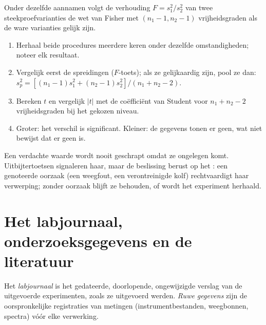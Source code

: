 \begin{proposition}[$F$-toets]\label{prop:b3:lab-techniques-3:f-test}
Onder dezelfde aannamen volgt de verhouding $F = s_1^2/s_2^2$ van twee steekproefvarianties
de wet van Fisher met $(n_1 - 1, n_2 - 1)$ vrijheidsgraden als de ware varianties gelijk zijn.
\admitted
\end{proposition}

\begin{method}\label{met:b3:lab-techniques-3:compare-means}
\begin{enumerate}
  \item Herhaal beide procedures meerdere keren onder dezelfde
        omstandigheden; noteer elk resultaat.
  \item Vergelijk eerst de spreidingen ($F$-toets); als ze gelijkaardig zijn, pool ze dan:
        $s_p^2 = [(n_1 - 1)s_1^2 + (n_2 - 1)s_2^2]/(n_1 + n_2 - 2)$.
  \item Bereken $t$ en vergelijk $|t|$ met de coëfficiënt van Student voor $n_1 + n_2 - 2$
        vrijheidsgraden bij het gekozen niveau.
  \item Groter: het verschil is significant. Kleiner: de gegevens tonen er
        geen, wat niet bewijst dat er geen is.
\end{enumerate}
\end{method}

Een verdachte waarde wordt nooit geschrapt omdat ze ongelegen komt.
Uitbijtertoetsen signaleren haar, maar de beslissing berust op het
: een genoteerde oorzaak (een weegfout, een verontreinigde
kolf) rechtvaardigt haar verwerping; zonder oorzaak blijft ze behouden,
of wordt het experiment herhaald.

\section{Het labjournaal, onderzoeksgegevens en de literatuur}

\begin{definition}\label{def:b3:lab-techniques-3:notebook}
Het \emph{labjournaal} is het gedateerde, doorlopende,
ongewijzigde verslag van de uitgevoerde experimenten, zoals ze uitgevoerd
werden. \emph{Ruwe gegevens} zijn de oorspronkelijke
registraties van metingen (instrumentbestanden, weegbonnen, spectra)
vóór elke verwerking.
\end{definition}

